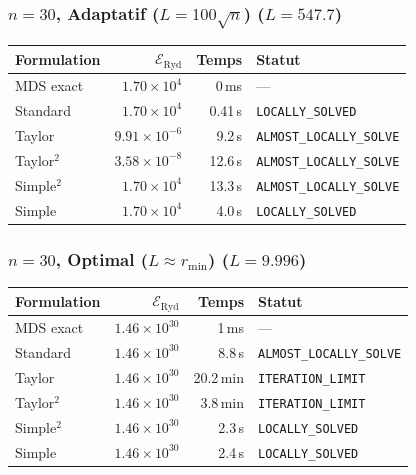 \subsubsection{$n=30$, Adaptatif ($L{=}100\sqrt{n}$) ($L=547.7$)}
\begin{longtable}{@{}lrrl@{}}
  \toprule
  Formulation & $\mathcal{E}_{\mathrm{Ryd}}$ & Temps & Statut \\
  \midrule
  \endhead
  MDS exact & $1.70\times10^{4}$ & 0\,ms & --- \\
  Standard & $1.70\times10^{4}$ & 0.41\,s & \texttt{LOCALLY\_SOLVED} \\
  Taylor & $9.91\times10^{-6}$ & 9.2\,s & \texttt{ALMOST\_LOCALLY\_SOLVE} \\
  Taylor$^2$ & $3.58\times10^{-8}$ & 12.6\,s & \texttt{ALMOST\_LOCALLY\_SOLVE} \\
  Simple$^2$ & $1.70\times10^{4}$ & 13.3\,s & \texttt{ALMOST\_LOCALLY\_SOLVE} \\
  Simple & $1.70\times10^{4}$ & 4.0\,s & \texttt{LOCALLY\_SOLVED} \\
  \bottomrule
\end{longtable}

\subsubsection{$n=30$, Optimal ($L{\approx}r_{\min}$) ($L=9.996$)}
\begin{longtable}{@{}lrrl@{}}
  \toprule
  Formulation & $\mathcal{E}_{\mathrm{Ryd}}$ & Temps & Statut \\
  \midrule
  \endhead
  MDS exact & $1.46\times10^{30}$ & 1\,ms & --- \\
  Standard & $1.46\times10^{30}$ & 8.8\,s & \texttt{ALMOST\_LOCALLY\_SOLVE} \\
  Taylor & $1.46\times10^{30}$ & 20.2\,min & \texttt{ITERATION\_LIMIT} \\
  Taylor$^2$ & $1.46\times10^{30}$ & 3.8\,min & \texttt{ITERATION\_LIMIT} \\
  Simple$^2$ & $1.46\times10^{30}$ & 2.3\,s & \texttt{LOCALLY\_SOLVED} \\
  Simple & $1.46\times10^{30}$ & 2.4\,s & \texttt{LOCALLY\_SOLVED} \\
  \bottomrule
\end{longtable}

